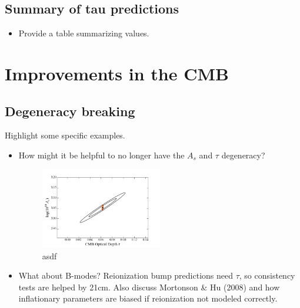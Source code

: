 \documentclass[twocolumn,aps,prd,nofootinbib,showpacs]{revtex4-1}
\begin{document}
\subsection{Summary of tau predictions}
\begin{itemize}
\item Provide a table summarizing values.
\end{itemize}

\section{Improvements in the CMB}
\subsection{Degeneracy breaking}
Highlight some specific examples.
\begin{itemize}
\item How might it be helpful to no longer have the $A_s$ and $\tau$ degeneracy?

\begin{figure}[!]
	\centering
	\includegraphics[width=0.5\textwidth]{figures/AsTau_w21cm.png}
	\caption{asdf}
	\label{fig:AsTau_w21cm}
\end{figure}

\item What about B-modes? Reionization bump predictions need $\tau$, so consistency tests are helped by 21cm. Also discuss Mortonson \& Hu (2008) and how inflationary parameters are biased if reionization not modeled correctly.
\end{itemize}
\end{document}
